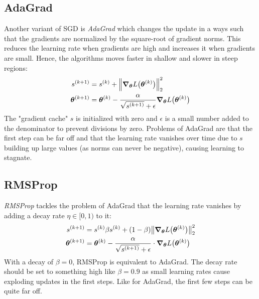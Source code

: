 		\subsection{AdaGrad}
			Another variant of SGD is \emph{AdaGrad} which changes the update in a ways such that the gradients are normalized by the square-root of gradient norms. This reduces the learning rate when gradients are high and increases it when gradients are small. Hence, the algorithms moves faster in shallow and slower in steep regions:
			\begin{align}
				s^{(k + 1)}            & = s^{(k)} + \Big\lVert \grad_{\bm{\theta}} L\bigl(\bm{\theta}^{(k)}\bigr) \Big\rVert_2^2                               \\
				\bm{\theta}^{(k + 1)} & = \bm{\theta}^{(k)} - \frac{\alpha}{\sqrt{s^{(k + 1)}} + \epsilon} \grad_{\bm{\theta}} L\bigl(\bm{\theta}^{(k)}\bigr)
			\end{align}
			The "gradient cache" \(s\) is initialized with zero and \(\epsilon\) is a small number added to the denominator to prevent divisions by zero. Problems of AdaGrad are that the first step can be far off and that the learning rate vanishes over time due to \(s\) building up large values (as norms can never be negative), causing learning to stagnate.

		\subsection{RMSProp}
			\emph{RMSProp} tackles the problem of AdaGrad that the learning rate vanishes by adding a decay rate \(\eta \in [0, 1)\) to it:
			\begin{align}
				s^{(k + 1)}            & = s^{(k)} \beta s^{(k)} + (1 - \beta) \big\lVert \grad_{\bm{\theta}} L\bigl(\bm{\theta}^{(k)}\bigr) \big\rVert_2^2           \\
				\bm{\theta}^{(k + 1)} & = \bm{\theta}^{(k)} - \frac{\alpha}{\sqrt{s^{(k + 1)}} + \epsilon} \cdot \grad_{\bm{\theta}} L\bigl(\bm{\theta}^{(k)}\bigr)
			\end{align}
			With a decay of \( \beta = 0 \), RMSProp is equivalent to AdaGrad. The decay rate should be set to something high like \( \beta = 0.9 \) as small learning rates cause exploding updates in the first steps. Like for AdaGrad, the first few steps can be quite far off.

